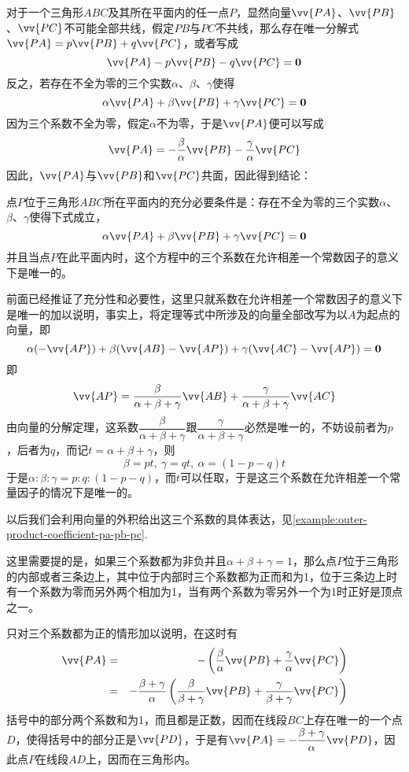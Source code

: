 \begin{example}
  \label{example:point-P-and-triangle-ABC}
  对于一个三角形$ABC$及其所在平面内的任一点$P$，显然向量$\vv{PA}$、$\vv{PB}$、$\vv{PC}$不可能全部共线，假定$PB$与$PC$不共线，那么存在唯一分解式$\vv{PA}=p\vv{PB}+q\vv{PC}$，或者写成
  \[ \vv{PA}-p\vv{PB}-q\vv{PC}=\bm{0} \]
  反之，若存在不全为零的三个实数$\alpha$、$\beta$、$\gamma$使得
  \[ \alpha \vv{PA} + \beta \vv{PB} + \gamma \vv{PC} = \bm{0} \]
  因为三个系数不全为零，假定$\alpha$不为零，于是$\vv{PA}$便可以写成
  \[ \vv{PA} = -\frac{\beta}{\alpha} \vv{PB} - \frac{\gamma}{\alpha} \vv{PC} \]
  因此，$\vv{PA}$与$\vv{PB}$和$\vv{PC}$共面，因此得到结论：
  \begin{theorem}
    点$P$位于三角形$ABC$所在平面内的充分必要条件是：存在不全为零的三个实数$\alpha$、$\beta$、$\gamma$使得下式成立，
    \[ \alpha \vv{PA} + \beta \vv{PB} + \gamma \vv{PC} = \bm{0} \]
    并且当点$P$在此平面内时，这个方程中的三个系数在允许相差一个常数因子的意义下是唯一的。
  \end{theorem}
  前面已经推证了充分性和必要性，这里只就系数在允许相差一个常数因子的意义下是唯一的加以说明，事实上，将定理等式中所涉及的向量全部改写为以$A$为起点的向量，即
  \[ \alpha (-\vv{AP}) + \beta (\vv{AB}-\vv{AP}) + \gamma (\vv{AC}-\vv{AP}) = \bm{0} \]
  即
  \[ \vv{AP} = \frac{\beta}{\alpha+\beta+\gamma} \vv{AB} + \frac{\gamma}{\alpha+\beta+\gamma} \vv{AC} \]
  由向量的分解定理，这系数$\dfrac{\beta}{\alpha+\beta+\gamma}$跟$\dfrac{\gamma}{\alpha+\beta+\gamma}$必然是唯一的，不妨设前者为$p$，后者为$q$，而记$t=\alpha+\beta+\gamma$，则
  \[ \beta=pt, \  \gamma=qt, \  \alpha=(1-p-q)t \]
  于是$\alpha:\beta:\gamma=p:q:(1-p-q)$，而$t$可以任取，于是这三个系数在允许相差一个常量因子的情况下是唯一的。

以后我们会利用向量的外积给出这三个系数的具体表达，见\autoref{example:outer-product-coefficient-pa-pb-pc}.
  
这里需要提的是，如果三个系数都为非负并且$\alpha+\beta+\gamma = 1$，那么点$P$位于三角形的内部或者三条边上，其中位于内部时三个系数都为正而和为1，位于三条边上时有一个系数为零而另外两个相加为1，当有两个系数为零另外一个为1时正好是顶点之一。

  只对三个系数都为正的情形加以说明，在这时有
  \begin{eqnarray*}
    \vv{PA} & = & - \left( \frac{\beta}{\alpha}\vv{PB} + \frac{\gamma}{\alpha} \vv{PC} \right) \\
    & = & -\frac{\beta+\gamma}{\alpha} \left( \frac{\beta}{\beta+\gamma} \vv{PB} + \frac{\gamma}{\beta+\gamma} \vv{PC} \right)
  \end{eqnarray*}
  括号中的部分两个系数和为1，而且都是正数，因而在线段$BC$上存在唯一的一个点$D$，使得括号中的部分正是$\vv{PD}$，于是有$\vv{PA}=-\dfrac{\beta+\gamma}{\alpha} \vv{PD}$，因此点$P$在线段$AD$上，因而在三角形内。


\end{example}
